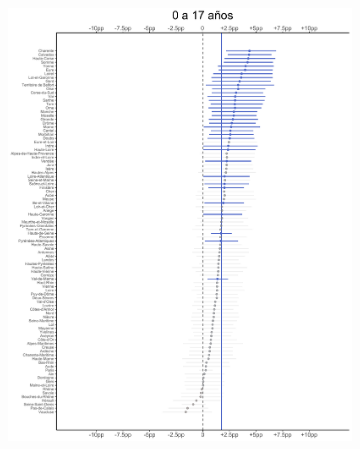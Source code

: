 \begin{figure}
	\centering
	\begin{subfigure}{0.3\textwidth}
	\includegraphics[width = \textwidth]{Figs/Efectos/Efectos_Ed1_Modelo_H}
	\end{subfigure}
	~
	\begin{subfigure}{0.3\textwidth}

\end{subfigure}
\end{figure}
